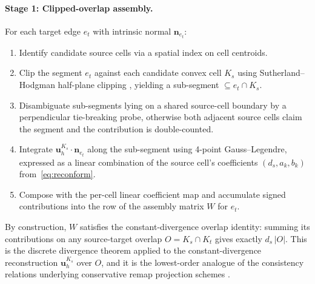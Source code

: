 \documentclass[10pt]{article}
\newcommand{\uh}{\mathbf{u}_h}
\newcommand{\nv}{\mathbf{n}}
\begin{document}
\paragraph{Stage 1: Clipped-overlap assembly.}
For each target edge $e_t$ with intrinsic normal $\nv_{e_t}$:
\begin{enumerate}[label={(\roman*)},itemsep=1pt,topsep=2pt,leftmargin=*]
\item Identify candidate source cells via a spatial index on cell centroids.
\item Clip the segment $e_t$ against each candidate convex cell $K_s$ using Sutherland--Hodgman half-plane clipping \cite{SutherlandHodgman1974}, yielding a sub-segment $\subseteq e_t \cap K_s$.
\item Disambiguate sub-segments lying on a shared source-cell boundary by a perpendicular tie-breaking probe, otherwise both adjacent source cells claim the segment and the contribution is double-counted.
\item Integrate $\uh^{K_s}\!\cdot\!\nv_{e_t}$ along the sub-segment using 4-point Gauss--Legendre, expressed as a linear combination of the source cell's coefficients $(d_s, a_k, b_k)$ from~\eqref{eq:reconform}.
\item Compose with the per-cell linear coefficient map and accumulate signed contributions into the row of the assembly matrix $W$ for $e_t$.
\end{enumerate}
By construction, $W$ satisfies the constant-divergence overlap identity: summing its contributions on any source-target overlap $O = K_s \cap K_t$ gives exactly $d_s\,|O|$. This is the discrete divergence theorem applied to the constant-divergence reconstruction $\uh^{K_s}$ over $O$, and it is the lowest-order analogue of the consistency relations underlying conservative remap projection schemes \cite{Jones1999}.
\end{document}
